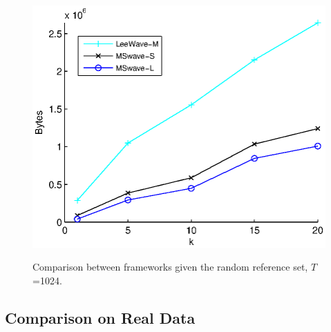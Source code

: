 \begin{figure}[t!]
{\includegraphics[scale=0.45]{2(e).eps}
}\hspace{0.1cm}
\vspace{-0.05in}
\caption{Comparison between frameworks given the random reference set, 
$T$=1024.}
\label{fig:2}
\end{figure}

\subsection{Comparison on Real Data}

